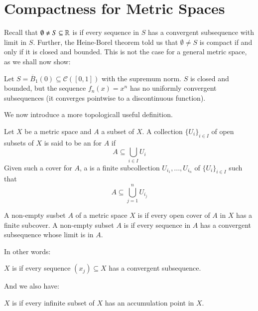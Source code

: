 \section{Compactness for Metric Spaces}

Recall that $\emptyset \neq S \subseteq \mathbb R$ is  if every sequence in $S$ has a convergent subsequence with limit in $S$. Further, the Heine-Borel theorem told us that $\emptyset \neq S$ is compact if and only if it is closed and bounded. This is not the case for a general metric space, as we shall now show:

\begin{example}
    Let $S = \overline{B}_1(0) \subseteq \mathcal{C}([0,1])$ with the supremum norm. $S$ is closed and bounded, but the sequence $f_n(x) = x^n$ has no uniformly convergent subsequences (it converges pointwise to a discontinuous function).
\end{example}

We now introduce a more topologicall useful definition.

\begin{definition}
    Let $X$ be a metric space and $A$ a subset of $X$. A collection $\{U_i\}_{i \in I}$ of open subsets of $X$ is said to be an  for $A$ if $$A \subseteq \bigcup_{i\in I}U_i$$ Given such a cover for $A$, a  is a finite subcollection $U_{i_1},...,U_{i_n}$ of $\{U_i\}_{i \in I}$ such that $$A \subseteq \bigcup_{j=1}^nU_{i_j}$$
\end{definition}

\begin{definition}[Compactness]
    A non-empty susbet $A$ of a metric space $X$ is  if every open cover of $A$ in $X$ has a finite subcover. A non-empty subset $A$ is  if every sequence in $A$ has a convergent subsequence whose limit is in $A$.
\end{definition}

In other words:

\begin{definition}
    $X$ is  if every sequence $(x_j) \subseteq X$ has a convergent subsequence.
\end{definition}

And we also have:

\begin{definition}
    $X$ is  if every infinite subset of $X$ has an accumulation point in $X$.
\end{definition}

